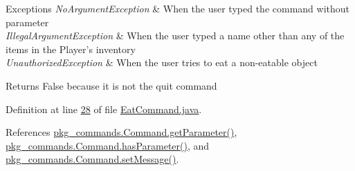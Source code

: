 \begin{DoxyExceptions}{Exceptions}
{\em No\-Argument\-Exception} & When the user typed the command without parameter \\
\hline
{\em Illegal\-Argument\-Exception} & When the user typed a name other than any of the items in the Player's inventory \\
\hline
{\em Unauthorized\-Exception} & When the user tries to eat a non-\/eatable object \\
\hline
\end{DoxyExceptions}
\begin{DoxyReturn}{Returns}
False because it is not the quit command 
\end{DoxyReturn}


Definition at line \hyperlink{EatCommand_8java_source_l00028}{28} of file \hyperlink{EatCommand_8java_source}{Eat\-Command.\-java}.



References \hyperlink{Command_8java_source_l00041}{pkg\-\_\-commands.\-Command.\-get\-Parameter()}, \hyperlink{Command_8java_source_l00073}{pkg\-\_\-commands.\-Command.\-has\-Parameter()}, and \hyperlink{Command_8java_source_l00089}{pkg\-\_\-commands.\-Command.\-set\-Message()}.


